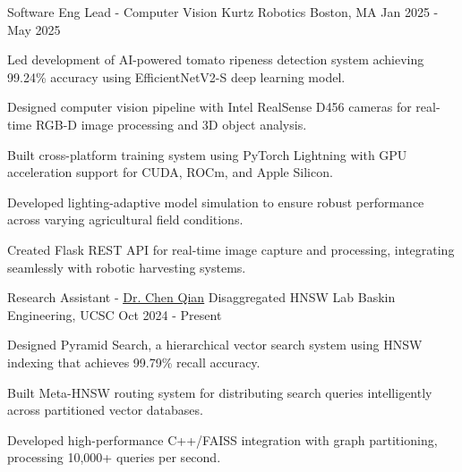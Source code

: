 \vspace{-2.0mm}

\begin{cventries}

\cventry
    {Software Eng Lead - Computer Vision} %
    {Kurtz Robotics} %
    {Boston, MA} %
    {Jan 2025 - May 2025} %
    {
    \begin{cvitems}
      \item {Led development of AI-powered tomato ripeness detection system achieving 99.24\% accuracy using EfficientNetV2-S deep learning model.}
      \item {Designed computer vision pipeline with Intel RealSense D456 cameras for real-time RGB-D image processing and 3D object analysis.}
      \item {Built cross-platform training system using PyTorch Lightning with GPU acceleration support for CUDA, ROCm, and Apple Silicon.}
      \item {Developed lighting-adaptive model simulation to ensure robust performance across varying agricultural field conditions.}
      \item {Created Flask REST API for real-time image capture and processing, integrating seamlessly with robotic harvesting systems.}
    \end{cvitems}
    }
\cventry
    {Research Assistant - \href{https://users.soe.ucsc.edu/~qian/}{\uline{Dr. Chen Qian}}} %
    {Disaggregated HNSW Lab} %
    {Baskin Engineering, UCSC} %
    {Oct 2024 - Present} %
    {
        \begin{cvitems}
        \item {Designed Pyramid Search, a hierarchical vector search system using HNSW indexing that achieves 99.79\% recall accuracy.}
        \item {Built Meta-HNSW routing system for distributing search queries intelligently across partitioned vector databases.}
        \item {Developed high-performance C++/FAISS integration with graph partitioning, processing 10,000+ queries per second.}

\end{cvitems}}
\end{cventries}
